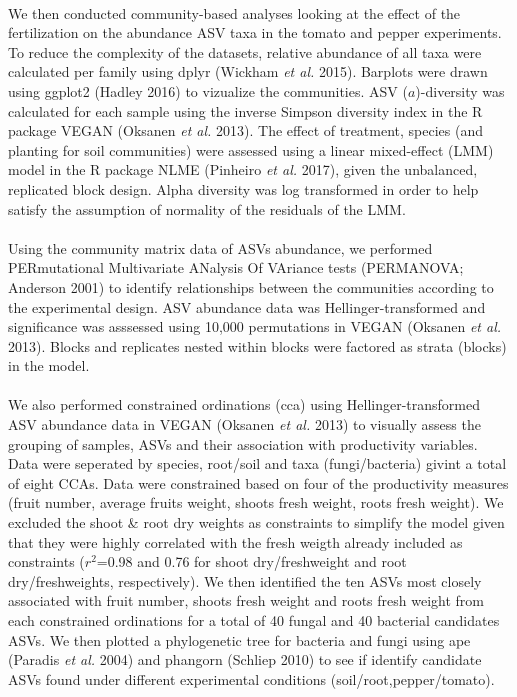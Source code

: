 \documentclass[11pt,]{article}
\begin{document}
\hspace*{0.333em}\\
We then conducted community-based analyses looking at the effect of the
fertilization on the abundance ASV taxa in the tomato and pepper
experiments. To reduce the complexity of the datasets, relative
abundance of all taxa were calculated per family using dplyr (Wickham
\emph{et al.} 2015). Barplots were drawn using ggplot2 (Hadley 2016) to
vizualize the communities. ASV (\(a\))-diversity was calculated for each
sample using the inverse Simpson diversity index in the R package VEGAN
(Oksanen \emph{et al.} 2013). The effect of treatment, species (and
planting for soil communities) were assessed using a linear mixed-effect
(LMM) model in the R package NLME (Pinheiro \emph{et al.} 2017), given
the unbalanced, replicated block design. Alpha diversity was log
transformed in order to help satisfy the assumption of normality of the
residuals of the LMM.\\
\hspace*{0.333em}\\
Using the community matrix data of ASVs abundance, we performed
PERmutational Multivariate ANalysis Of VAriance tests (PERMANOVA;
Anderson 2001) to identify relationships between the communities
according to the experimental design. ASV abundance data was
Hellinger-transformed and significance was asssessed using 10,000
permutations in VEGAN (Oksanen \emph{et al.} 2013). Blocks and
replicates nested within blocks were factored as strata (blocks) in the
model.\\
\hspace*{0.333em}\\
We also performed constrained ordinations (cca) using
Hellinger-transformed ASV abundance data in VEGAN (Oksanen \emph{et al.}
2013) to visually assess the grouping of samples, ASVs and their
association with productivity variables. Data were seperated by species,
root/soil and taxa (fungi/bacteria) givint a total of eight CCAs. Data
were constrained based on four of the productivity measures (fruit
number, average fruits weight, shoots fresh weight, roots fresh weight).
We excluded the shoot \& root dry weights as constraints to simplify the
model given that they were highly correlated with the fresh weigth
already included as constraints (\(r^2\)=0.98 and 0.76 for shoot
dry/freshweight and root dry/freshweights, respectively). We then
identified the ten ASVs most closely associated with fruit number,
shoots fresh weight and roots fresh weight from each constrained
ordinations for a total of 40 fungal and 40 bacterial candidates ASVs.
We then plotted a phylogenetic tree for bacteria and fungi using ape
(Paradis \emph{et al.} 2004) and phangorn (Schliep 2010) to see if
identify candidate ASVs found under different experimental conditions
(soil/root,pepper/tomato).
\end{document}
